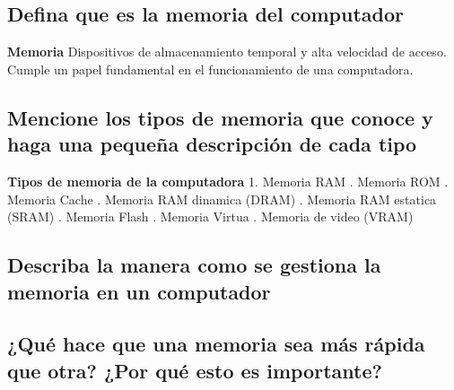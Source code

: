 \documentclass{article}
\begin{document}
\subsection{Defina que es la memoria del computador}


\begin{tcolorbox}[colupper=red!75!black]
	\textbf{Memoria}
	\tcblower
	Dispositivos de almacenamiento temporal y alta velocidad de acceso. Cumple un papel fundamental en el funcionamiento de una computadora.
\end{tcolorbox}

\subsection{Mencione los tipos de memoria que conoce y haga una pequeña descripción de cada tipo}

\begin{tcolorbox}[colupper=red!75!black]
	\textbf{Tipos de memoria de la computadora}
	1. Memoria RAM
	. Memoria ROM
	. Memoria Cache
	. Memoria RAM dinamica (DRAM)
	. Memoria RAM estatica (SRAM)
	. Memoria Flash
	. Memoria Virtua
	. Memoria de video (VRAM)
\end{tcolorbox}

\subsection{Describa la manera como se gestiona la memoria en un computador}

\begin{tcolorbox}[colupper=red!75!black]
	\textbf{}
	\tcblower
	
\end{tcolorbox}

\subsection{¿Qué hace que una memoria sea más rápida que otra? ¿Por qué esto es importante?}
\begin{tcolorbox}[colupper=red!75!black]
	\textbf{}
	\tcblower
	
\end{tcolorbox}
\end{document}
